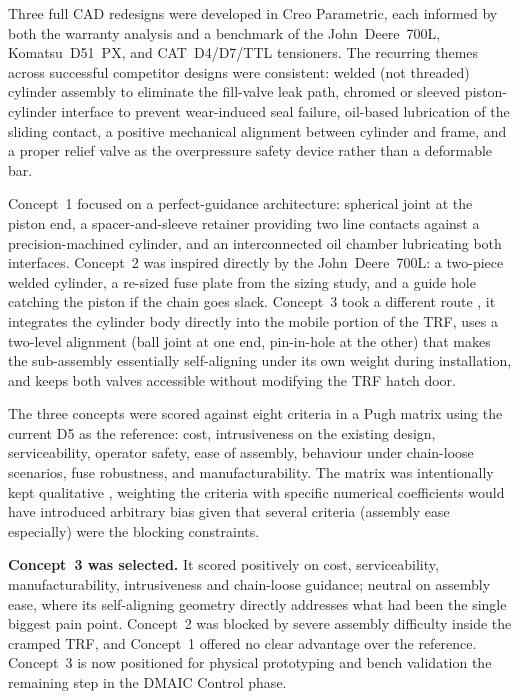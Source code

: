 \documentclass[11pt,a4paper]{article}
\begin{document}
Three full CAD redesigns were developed in Creo Parametric, each informed by both the warranty analysis and a benchmark of the John~Deere~700L, Komatsu~D51~PX, and CAT~D4/D7/TTL tensioners. The recurring themes across successful competitor designs were consistent: welded (not threaded) cylinder assembly to eliminate the fill-valve leak path, chromed or sleeved piston-cylinder interface to prevent wear-induced seal failure, oil-based lubrication of the sliding contact, a positive mechanical alignment between cylinder and frame, and a proper relief valve as the overpressure safety device rather than a deformable bar.

Concept~1 focused on a perfect-guidance architecture: spherical joint at the piston end, a spacer-and-sleeve retainer providing two line contacts against a precision-machined cylinder, and an interconnected oil chamber lubricating both interfaces. Concept~2 was inspired directly by the John~Deere~700L: a two-piece welded cylinder, a re-sized fuse plate from the sizing study, and a guide hole catching the piston if the chain goes slack. Concept~3 took a different route , it integrates the cylinder body directly into the mobile portion of the TRF, uses a two-level alignment (ball joint at one end, pin-in-hole at the other) that makes the sub-assembly essentially self-aligning under its own weight during installation, and keeps both valves accessible without modifying the TRF hatch door.

The three concepts were scored against eight criteria in a Pugh matrix using the current D5 as the reference: cost, intrusiveness on the existing design, serviceability, operator safety, ease of assembly, behaviour under chain-loose scenarios, fuse robustness, and manufacturability. The matrix was intentionally kept qualitative , weighting the criteria with specific numerical coefficients would have introduced arbitrary bias given that several criteria (assembly ease especially) were the blocking constraints.

\textbf{Concept~3 was selected.} It scored positively on cost, serviceability, manufacturability, intrusiveness and chain-loose guidance; neutral on assembly ease, where its self-aligning geometry directly addresses what had been the single biggest pain point. Concept~2 was blocked by severe assembly difficulty inside the cramped TRF, and Concept~1 offered no clear advantage over the reference. Concept~3 is now positioned for physical prototyping and bench validation the remaining step in the DMAIC Control phase.
\end{document}
